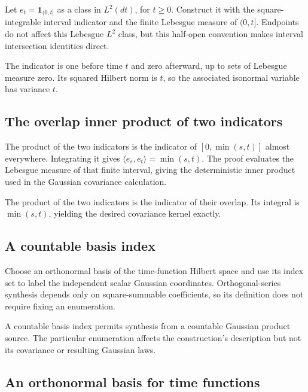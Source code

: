 \documentclass[11pt,a4paper]{article}
\begin{document}
Let \(e_t=\mathbf1_{(0,t]}\) as a class in \(L^2(dt)\), for \(t\ge0\). Construct it with the square-integrable interval indicator and the finite Lebesgue measure of \((0,t]\). Endpoints do not affect this Lebesgue \(L^2\) class, but this half-open convention makes interval intersection identities direct.



The indicator is one before time \(t\) and zero afterward, up to sets of Lebesgue measure zero. Its squared Hilbert norm is \(t\), so the associated isonormal variable has variance \(t\).


\subsection{\texorpdfstring{The overlap inner product of two indicators}{The overlap inner product of two indicators}}


The product of the two indicators is the indicator of \([0,\min(s,t)]\) almost everywhere. Integrating it gives \(\langle e_s,e_t\rangle=\min(s,t)\). The proof evaluates the Lebesgue measure of that finite interval, giving the deterministic inner product used in the Gaussian covariance calculation.



The product of the two indicators is the indicator of their overlap. Its integral is \(\min(s,t)\), yielding the desired covariance kernel exactly.


\subsection{\texorpdfstring{A countable basis index}{A countable basis index}}


Choose an orthonormal basis of the time-function Hilbert space and use its index set to label the independent scalar Gaussian coordinates. Orthogonal-series synthesis depends only on square-summable coefficients, so its definition does not require fixing an enumeration.



A countable basis index permits synthesis from a countable Gaussian product source. The particular enumeration affects the construction's description but not its covariance or resulting Gaussian laws.


\subsection{\texorpdfstring{An orthonormal basis for time functions}{An orthonormal basis for time functions}}
\end{document}
